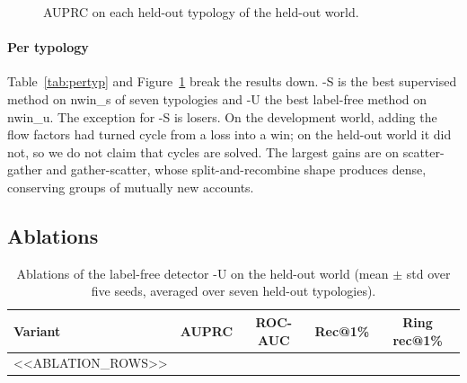 \begin{figure}[t]
\centering
{}
\caption{AUPRC on each held-out typology of the held-out world.}
\label{fig:pertyp}
\end{figure}

\paragraph{Per typology}
Table~\ref{tab:pertyp} and Figure~\ref{fig:pertyp} break the results down. \coral{}-S is the best supervised method on {{nwin_s}} of seven typologies and \coral{}-U the best label-free method on {{nwin_u}}. The exception for \coral{}-S is {{losers}}. On the development world, adding the flow factors had turned cycle from a loss into a win; on the held-out world it did not, so we do not claim that cycles are solved. The largest gains are on scatter-gather and gather-scatter, whose split-and-recombine shape produces dense, conserving groups of mutually new accounts.

\subsection{Ablations}

\begin{table}[t]
\centering
\caption{Ablations of the label-free detector \coral{}-U on the held-out world (mean $\pm$ std over five seeds, averaged over seven held-out typologies).}
\label{tab:ablation}
\small
\begin{tabular}{lcccc}
\toprule
Variant & AUPRC & ROC-AUC & Rec@1\% & Ring rec@1\% \\
\midrule
<<ABLATION_ROWS>>
\bottomrule
\end{tabular}
\end{table}

